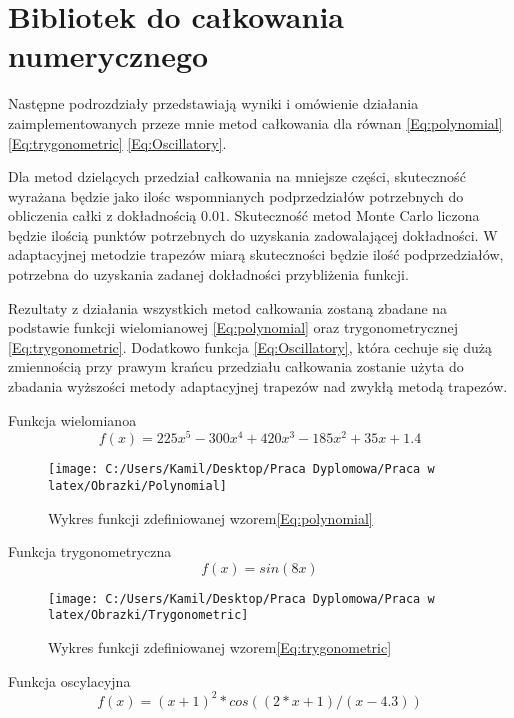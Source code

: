\documentclass[12pt,twoside]{article}
\begin{document}
\section{Bibliotek do całkowania numerycznego}
Następne podrozdziały przedstawiają wyniki i omówienie działania zaimplementowanych przeze mnie metod całkowania dla równan \eqref{Eq:polynomial} \eqref{Eq:trygonometric} \eqref{Eq:Oscillatory}. 

Dla metod dzielących przedział całkowania na mniejsze części, skuteczność wyrażana będzie jako ilośc wspomnianych podprzedziałów potrzebnych do obliczenia całki z dokładnością $0.01$.
Skuteczność metod Monte Carlo liczona będzie ilością punktów potrzebnych do uzyskania zadowalającej dokładności.
W adaptacyjnej metodzie trapezów miarą skuteczności będzie ilość podprzedziałów, potrzebna do uzyskania zadanej dokładności przybliżenia funkcji.

Rezultaty z działania wszystkich metod całkowania zostaną zbadane na podstawie funkcji wielomianowej \eqref{Eq:polynomial} oraz trygonometrycznej \eqref{Eq:trygonometric}. Dodatkowo funkcja \eqref{Eq:Oscillatory}, która cechuje się dużą zmiennością przy prawym krańcu przedziału całkowania zostanie użyta do zbadania wyższości metody adaptacyjnej trapezów nad zwykłą metodą trapezów.

Funkcja wielomianoa
\begin{equation}
f(x) = 225x^5 - 300x^4 + 420x^3-185x^2+35x + 1.4
\label{Eq:polynomial}
\end{equation}

\begin{figure}[h]
\centering
\texttt{[image: C:/Users/Kamil/Desktop/Praca Dyplomowa/Praca w latex/Obrazki/Polynomial]}
\caption{Wykres funkcji zdefiniowanej wzorem\eqref{Eq:polynomial}}
\end{figure}

Funkcja trygonometryczna
\begin{equation}
f(x) = sin(8x)
\label{Eq:trygonometric}
\end{equation}

\begin{figure}[h]
\centering
\texttt{[image: C:/Users/Kamil/Desktop/Praca Dyplomowa/Praca w latex/Obrazki/Trygonometric]}
\caption{Wykres funkcji zdefiniowanej wzorem\eqref{Eq:trygonometric}}
\end{figure}

Funkcja oscylacyjna
\begin{equation}
f(x) = (x+1)^2*cos((2*x+1)/(x-4.3))
\label{Eq:Oscillatory}
\end{equation}
\end{document}
